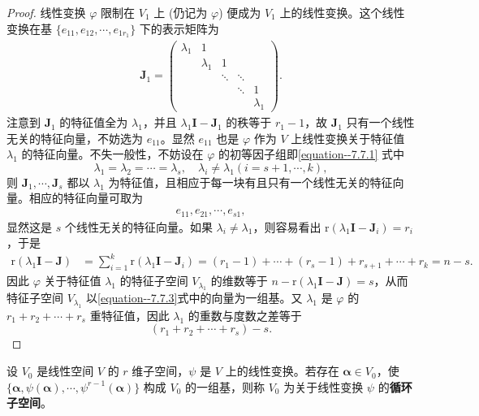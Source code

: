 \documentclass[../../main.tex]{subfiles}
\begin{document}
\begin{proof}
线性变换 $\varphi$ 限制在 $V_1$ 上 (仍记为 $\varphi$) 便成为 $V_1$ 上的线性变换。这个线性变换在基 $\{e_{11}, e_{12}, \cdots, e_{1r_1}\}$ 下的表示矩阵为
\begin{align*}
\boldsymbol{J}_1 = 
\begin{pmatrix}
\lambda_1 & 1 & & & \\
 & \lambda_1 & 1 & & \\
 & & \ddots & \ddots & \\
 & & & \ddots & 1 \\
 & & & & \lambda_1
\end{pmatrix}.
\end{align*}
注意到 $\boldsymbol{J}_1$ 的特征值全为 $\lambda_1$，并且 $\lambda_1\boldsymbol{I} - \boldsymbol{J}_1$ 的秩等于 $r_1 - 1$，故 $\boldsymbol{J}_1$ 只有一个线性无关的特征向量，不妨选为 $e_{11}$。显然 $e_{11}$ 也是 $\varphi$ 作为 $V$ 上线性变换关于特征值 $\lambda_1$ 的特征向量。不失一般性，不妨设在 $\varphi$ 的初等因子组即\eqref{equation--7.7.1} 式中
\[
\lambda_1 = \lambda_2 = \cdots = \lambda_s, \quad \lambda_i \neq \lambda_1 (i = s + 1, \cdots, k),
\]
则 $\boldsymbol{J}_1, \cdots, \boldsymbol{J}_s$ 都以 $\lambda_1$ 为特征值，且相应于每一块有且只有一个线性无关的特征向量。相应的特征向量可取为
\begin{align}
e_{11}, e_{21}, \cdots, e_{s1}, \label{equation--7.7.3}
\end{align}
显然这是 $s$ 个线性无关的特征向量。如果 $\lambda_i \neq \lambda_1$，则容易看出 $\mathrm{r}(\lambda_1\boldsymbol{I} - \boldsymbol{J}_i) = r_i$，于是
\begin{align*}
\mathrm{r}(\lambda_1\boldsymbol{I} - \boldsymbol{J}) &= \sum_{i = 1}^{k} \mathrm{r}(\lambda_1\boldsymbol{I} - \boldsymbol{J}_i) = (r_1 - 1) + \cdots + (r_s - 1) + r_{s + 1} + \cdots + r_k = n - s.
\end{align*}
因此 $\varphi$ 关于特征值 $\lambda_1$ 的特征子空间 $V_{\lambda_1}$ 的维数等于 $n - \mathrm{r}(\lambda_1\boldsymbol{I} - \boldsymbol{J}) = s$，从而特征子空间 $V_{\lambda_1}$ 以\eqref{equation--7.7.3}式中的向量为一组基。又 $\lambda_1$ 是 $\varphi$ 的 $r_1 + r_2 + \cdots + r_s$ 重特征值，因此 $\lambda_1$ 的重数与度数之差等于
\[
(r_1 + r_2 + \cdots + r_s) - s.
\]
\end{proof}

\begin{definition}[循环子空间]
设 $V_0$ 是线性空间 $V$ 的 $r$ 维子空间，$\psi$ 是 $V$ 上的线性变换。若存在 $\boldsymbol{\alpha} \in V_0$，使 $\{\boldsymbol{\alpha}, \psi(\boldsymbol{\alpha}), \cdots, \psi^{r - 1}(\boldsymbol{\alpha})\}$ 构成 $V_0$ 的一组基，则称 $V_0$ 为关于线性变换 $\psi$ 的\textbf{循环子空间}。 
\end{definition}
\end{document}
